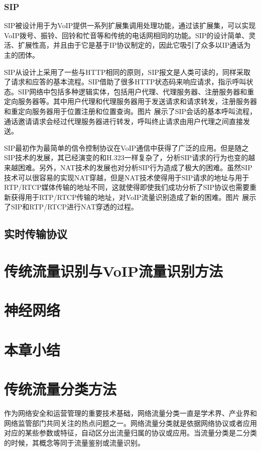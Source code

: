 \subsubsection{SIP}
SIP被设计用于为VoIP提供一系列扩展集调用处理功能，通过该扩展集，可以实现VoIP拨号、振铃、回铃和忙音等和传统的电话网相同的功能。SIP的设计简单、灵活、扩展性高，并且由于它是基于IP协议制定的，因此它吸引了众多以IP通话为主的团体。

SIP从设计上采用了一些与HTTP相同的原则，SIP报文是人类可读的，同样采取了请求和应答的基本流程。SIP借助了很多HTTP状态码来响应请求，指示呼叫状态。SIP网络中包括多种逻辑实体，包括用户代理、代理服务器、注册服务器和重定向服务器等。其中用户代理和代理服务器用于发送请求和请求转发，注册服务器和重定向服务器用于位置注册和位置查询。图片 展示了SIP会话的基本呼叫流程，通话邀请请求会经过代理服务器进行转发，呼叫终止请求由用户代理之间直接发送。

SIP最初作为最简单的信令控制协议在VoIP通信中获得了广泛的应用。但是随之SIP技术的发展，其已经演变的和H.323一样复杂了，分析SIP请求的行为也变的越来越困难。另外，NAT技术的发展也对分析SIP行为造成了极大的困难。虽然SIP技术可以很容易的实现NAT穿越，但是NAT技术使得用于SIP请求的地址与用于RTP/RTCP媒体传输的地址不同，这就使得即使我们成功分析了SIP协议也需要重新获得用于RTP/RTCP传输的地址，对VoIP流量识别造成了新的困难。图片 展示了SIP和RTP/RTCP进行NAT穿透的过程。



\subsection{实时传输协议}

\section{传统流量识别与VoIP流量识别方法}

\section{神经网络}

\section{本章小结}


\section{传统流量分类方法}
作为网络安全和运营管理的重要技术基础，网络流量分类一直是学术界、产业界和网络监管部门共同关注的热点问题之一。网络流量分类就是依据网络协议或者应用对应的某些参数或特征，自动区分出流量归属的协议或应用。当流量分类是二分类的时候，其概念等同于流量鉴别或流量识别。

